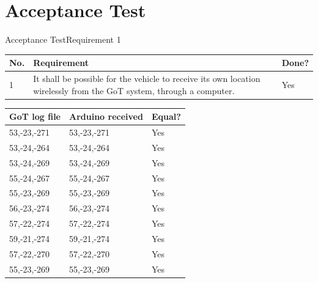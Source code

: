 
\section{Acceptance Test}


\begin{frame}{Acceptance Test}{Requirement 1}

\begin{table}[H] \centering
\begin{tabular}{|p{0.5cm}| p{7cm} |p{1cm}|}
\hline%
\textbf{No.}  &  \textbf{Requirement}  & \textbf{Done?}     \\ 
\hline
1 & It shall be possible for the vehicle to receive its own location wirelessly from the GoT system, through a computer. & Yes \\
\hline
\end{tabular}
\end{table}

  \pause

\begin{table}[H]
\centering
\begin{tabular}{|l|l|l|}
\hline
GoT log file & Arduino received & Equal? \\
\hline
53,-23,-271 & 53,-23,-271 & Yes \\
\hline
53,-24,-264 & 53,-24,-264 & Yes \\
\hline
53,-24,-269 & 53,-24,-269 & Yes \\
\hline
55,-24,-267 & 55,-24,-267 & Yes \\
\hline
55,-23,-269 & 55,-23,-269 & Yes \\
\hline
56,-23,-274 & 56,-23,-274 & Yes \\
\hline
57,-22,-274 & 57,-22,-274 & Yes \\
\hline
59,-21,-274 & 59,-21,-274 & Yes \\
\hline
57,-22,-270 & 57,-22,-270 & Yes \\
\hline
55,-23,-269 & 55,-23,-269 & Yes \\
\hline
\end{tabular}
\end{table}

\end{frame}




